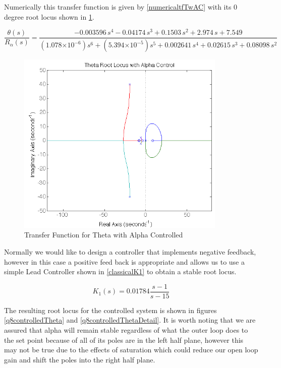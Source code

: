 \documentclass{article}
\theoremstyle{plain}
\theoremstyle{definition}
\theoremstyle{remark}
\providecommand{\e}[1]{\ensuremath{\times 10^{#1}}}
\begin{document}
Numerically this transfer function is given by \eqref{numericaltfTwAC} with its 0 degree root locus shown in \ref{q8thetawAlphaControl}.

\begin{equation}
\frac{\theta(s)}{R_{\alpha}(s)} = \frac{-0.003596 \, s^4 - 0.04174\,  s^3 + 0.1503 \, s^2 + 2.974\, s + 7.549}{(1.078\e{-6}) s^6 + (5.394\e{-5}) s^5 + 0.002641 \, s^4 + 0.02615 \, s^3 + 0.08098 \, s^2}
\label{numericaltfTwAC}
\end{equation}

\begin{figure}
\begin{center}
\includegraphics[width = 10cm]{thetaAlphaControl.png}
\end{center}
\caption{Transfer Function for Theta with Alpha Controlled}
\label{q8thetawAlphaControl}
\end{figure}

Normally we would like to design a controller that implements negative feedback, however in this case a positive feed back is appropriate and allows us to use a simple Lead Controller shown in \eqref{classicalK1} to obtain a stable root locus.

\begin{equation}
K_1(s) = 0.01784 \frac{s - 1}{s - 15}
\label{classicalK1}
\end{equation}

The resulting root locus for the controlled system is shown in figures \ref{q8controlledTheta} and \ref{q8controlledThetaDetail}.  It is worth noting that we are assured that alpha will remain stable regardless of what the outer loop does to the set point because of all of its poles are in the left half plane, however this may not be true due to the effects of saturation which could reduce our open loop gain and shift the poles into the right half plane. 
\end{document}
